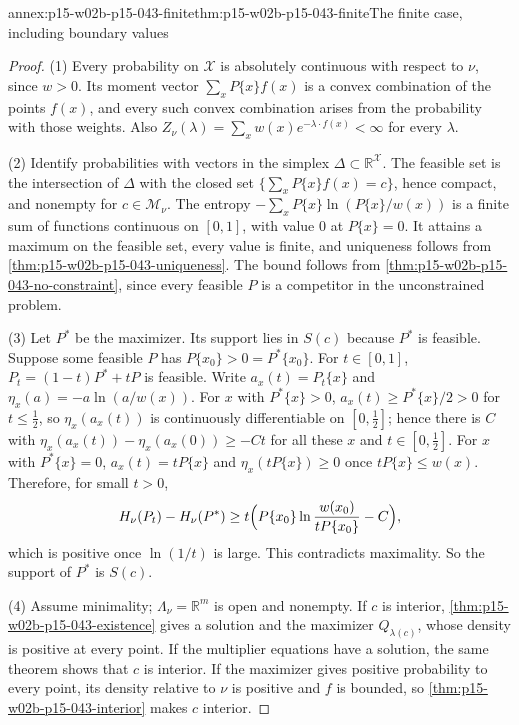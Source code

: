 \begin{annexitem}{annex:p15-w02b-p15-043-finite}{thm:p15-w02b-p15-043-finite}{The finite case, including boundary values}
\begin{proof}
(1) Every probability on \(\mathcal X\) is absolutely continuous with respect
to \(\nu\), since \(w>0\). Its moment vector \(\sum_xP\{x\}f(x)\) is a convex
combination of the points \(f(x)\), and every such convex combination arises
from the probability with those weights. Also
\(Z_\nu(\lambda)=\sum_xw(x)e^{-\lambda\cdot f(x)}<\infty\) for every
\(\lambda\).

(2) Identify probabilities with vectors in the simplex
\(\Delta\subset\mathbb R^{\mathcal X}\). The feasible set is the intersection of
\(\Delta\) with the closed set \(\{\sum_xP\{x\}f(x)=c\}\), hence compact, and
nonempty for \(c\in\mathcal M_\nu\). The entropy
\(-\sum_xP\{x\}\ln(P\{x\}/w(x))\) is a finite sum of functions continuous on
\([0,1]\), with value \(0\) at \(P\{x\}=0\). It attains a maximum on the
feasible set, every value is finite, and uniqueness follows from
\cref{thm:p15-w02b-p15-043-uniqueness}. The bound follows from
\cref{thm:p15-w02b-p15-043-no-constraint}, since every feasible \(P\) is a
competitor in the unconstrained problem.

(3) Let \(P^*\) be the maximizer. Its support lies in \(S(c)\) because \(P^*\)
is feasible. Suppose some feasible \(P\) has \(P\{x_0\}>0=P^*\{x_0\}\). For
\(t\in[0,1]\), \(P_t=(1-t)P^*+tP\) is feasible. Write \(a_x(t)=P_t\{x\}\) and
\(\eta_x(a)=-a\ln(a/w(x))\). For \(x\) with \(P^*\{x\}>0\), \(a_x(t)\geq
P^*\{x\}/2>0\) for \(t\leq\tfrac12\), so \(\eta_x(a_x(t))\) is continuously
differentiable on \([0,\tfrac12]\); hence there is \(C\) with
\(\eta_x(a_x(t))-\eta_x(a_x(0))\geq-Ct\) for all these \(x\) and
\(t\in[0,\tfrac12]\). For \(x\) with \(P^*\{x\}=0\), \(a_x(t)=tP\{x\}\) and
\(\eta_x(tP\{x\})\geq0\) once \(tP\{x\}\leq w(x)\). Therefore, for small \(t>0\),
\[
 H_\nu(P_t)-H_\nu(P^*)\geq t\Bigl(P\{x_0\}\ln\frac{w(x_0)}{tP\{x_0\}}-C\Bigr),
\]
which is positive once \(\ln(1/t)\) is large. This contradicts maximality.
So the support of \(P^*\) is \(S(c)\).

(4) Assume minimality; \(\Lambda_\nu=\mathbb R^m\) is open and nonempty. If
\(c\) is interior, \cref{thm:p15-w02b-p15-043-existence} gives a solution and
the maximizer \(Q_{\lambda(c)}\), whose density is positive at every point. If
the multiplier equations have a solution, the same theorem shows that \(c\) is
interior. If the maximizer gives positive probability to every point, its
density relative to \(\nu\) is positive and \(f\) is bounded, so
\cref{thm:p15-w02b-p15-043-interior} makes \(c\) interior.
\end{proof}
\end{annexitem}

